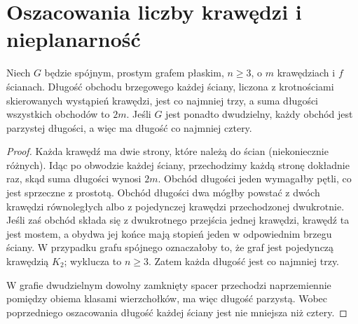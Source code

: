 \begin{center}
\end{center}

\section{Oszacowania liczby krawędzi i nieplanarność}
\label{sec:tg-planarne-granice}

\begin{lemat}
Niech $G$ będzie spójnym, prostym grafem płaskim,
$n\ge3$, o $m$ krawędziach i $f$ ścianach.
Długość obchodu brzegowego każdej ściany, liczona
z krotnościami skierowanych wystąpień krawędzi, jest
co najmniej trzy, a suma długości wszystkich obchodów
to $2m$. Jeśli $G$ jest ponadto dwudzielny, każdy
obchód jest parzystej długości, a więc ma długość co najmniej cztery.
\end{lemat}

\begin{proof}
Każda krawędź ma dwie strony, które należą do ścian
(niekoniecznie różnych). Idąc po obwodzie każdej ściany,
przechodzimy każdą stronę dokładnie raz, skąd suma długości
wynosi $2m$. Obchód długości jeden wymagałby pętli, co jest
sprzeczne z prostotą. Obchód długości dwa mógłby powstać
z dwóch krawędzi równoległych albo z pojedynczej krawędzi
przechodzonej dwukrotnie. Jeśli zaś obchód składa się z dwukrotnego przejścia
jednej krawędzi, krawędź ta jest mostem, a obydwa jej końce
mają stopień jeden w odpowiednim brzegu ściany.
W przypadku grafu spójnego oznaczałoby to, że graf jest
pojedynczą krawędzią $K_2$; wyklucza to $n\ge3$.
Zatem każda długość jest co najmniej trzy.

W grafie dwudzielnym dowolny zamknięty spacer przechodzi
naprzemiennie pomiędzy obiema klasami wierzchołków,
ma więc długość parzystą. Wobec poprzedniego oszacowania
długość każdej ściany jest nie mniejsza niż cztery.
\end{proof}

